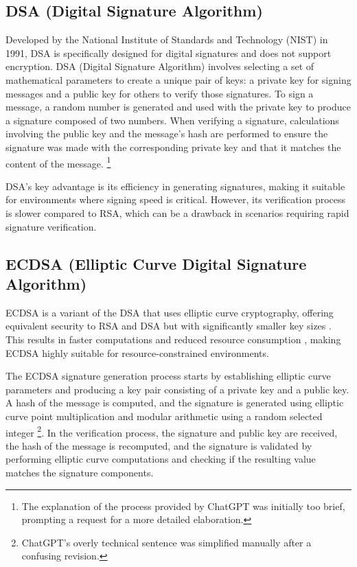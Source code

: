 \subsection{DSA (Digital Signature Algorithm)}

Developed by the National Institute of Standards and Technology (NIST) in 1991, DSA is specifically designed for digital signatures and does not support encryption. DSA (Digital Signature Algorithm) involves selecting a set of mathematical parameters to create a unique pair of keys: a private key for signing messages and a public key for others to verify those signatures. To sign a message, a random number is generated and used with the private key to produce a signature composed of two numbers. When verifying a signature, calculations involving the public key and the message's hash are performed to ensure the signature was made with the corresponding private key and that it matches the content of the message. \footnote{The explanation of the process provided by ChatGPT was initially too brief, prompting a request for a more detailed elaboration.}

DSA’s key advantage is its efficiency in generating signatures, making it suitable for environments where signing speed is critical. However, its verification process is slower compared to RSA, which can be a drawback in scenarios requiring rapid signature verification.


\subsection{ECDSA (Elliptic Curve Digital Signature Algorithm)}
\label{comparison:ecdsa}

ECDSA is a variant of the DSA that uses elliptic curve cryptography, offering equivalent security to RSA and DSA but with significantly smaller key sizes \cite{Xuan2009}. This results in faster computations and reduced resource consumption \cite{Levy2015}, making ECDSA highly suitable for resource-constrained environments.


The ECDSA signature generation process starts by establishing elliptic curve parameters and producing a key pair consisting of a private key and a public key. A hash of the message is computed, and the signature is generated using elliptic curve point multiplication and modular arithmetic using a random selected integer \footnote{ChatGPT's overly technical sentence was simplified manually after a confusing revision.}. In the verification process, the signature and public key are received, the hash of the message is recomputed, and the signature is validated by performing elliptic curve computations and checking if the resulting value matches the signature components. \cite{Xuan2009}

